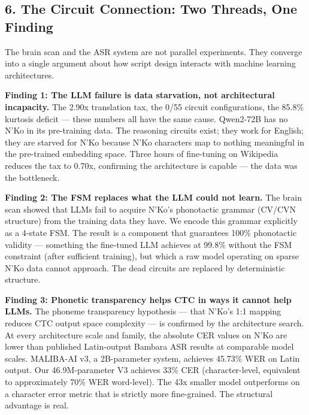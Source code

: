 \documentclass[
]{article}
\begin{document}
\subsection{6. The Circuit Connection: Two Threads, One
Finding}\label{the-circuit-connection-two-threads-one-finding}

The brain scan and the ASR system are not parallel experiments. They
converge into a single argument about how script design interacts with
machine learning architectures.

\textbf{Finding 1: The LLM failure is data starvation, not architectural
incapacity.} The 2.90x translation tax, the 0/55 circuit configurations,
the 85.8\% kurtosis deficit --- these numbers all have the same cause.
Qwen2-72B has no N'Ko in its pre-training data. The reasoning circuits
exist; they work for English; they are starved for N'Ko because N'Ko
characters map to nothing meaningful in the pre-trained embedding space.
Three hours of fine-tuning on Wikipedia reduces the tax to 0.70x,
confirming the architecture is capable --- the data was the bottleneck.

\textbf{Finding 2: The FSM replaces what the LLM could not learn.} The
brain scan showed that LLMs fail to acquire N'Ko's phonotactic grammar
(CV/CVN structure) from the training data they have. We encode this
grammar explicitly as a 4-state FSM. The result is a component that
guarantees 100\% phonotactic validity --- something the fine-tuned LLM
achieves at 99.8\% without the FSM constraint (after sufficient
training), but which a raw model operating on sparse N'Ko data cannot
approach. The dead circuits are replaced by deterministic structure.

\textbf{Finding 3: Phonetic transparency helps CTC in ways it cannot
help LLMs.} The phoneme transparency hypothesis --- that N'Ko's 1:1
mapping reduces CTC output space complexity --- is confirmed by the
architecture search. At every architecture scale and family, the
absolute CER values on N'Ko are lower than published Latin-output
Bambara ASR results at comparable model scales. MALIBA-AI v3, a
2B-parameter system, achieves 45.73\% WER on Latin output. Our
46.9M-parameter V3 achieves 33\% CER (character-level, equivalent to
approximately 70\% WER word-level). The 43x smaller model outperforms on
a character error metric that is strictly more fine-grained. The
structural advantage is real.
\end{document}
